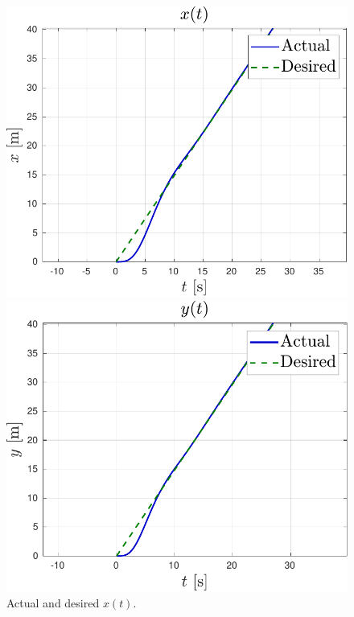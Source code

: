 \documentclass[main]{subfiles}
\begin{document}
\begin{figure}
    \centering
    \begin{minipage}[b]{0.45\textwidth}
        \centering
        \includegraphics[width=\textwidth]{images/pid_x.pdf}
        \caption[Tracking in X-axis]{Actual and desired $x(t)$.}
        \label{fig:pid_x}
    \end{minipage}
    \begin{minipage}[b]{0.45\textwidth}
        \centering
        \includegraphics[width=\textwidth]{images/pid_y.pdf}

\end{minipage}
\end{figure}
\end{document}

